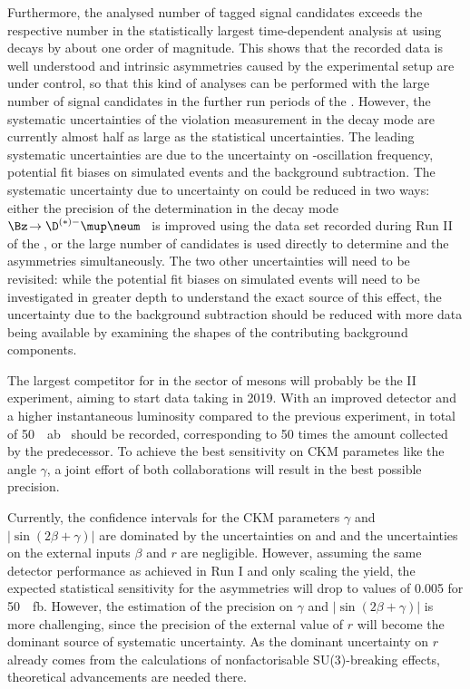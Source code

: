 Furthermore, the analysed number of tagged signal candidates exceeds the respective number in the statistically largest time-dependent \CP analysis at \lhcb using \BdToJPsiKS decays by about one order of magnitude.
This shows that the recorded data is well understood and intrinsic asymmetries caused by \eg the experimental setup are under control, so that this kind of analyses can be performed with the large number of signal candidates in the further run periods of the \lhc.
However, the systematic uncertainties of the \CP violation measurement in the decay mode \mbox{\BdToDpi} are currently almost half as large as the statistical uncertainties.
The leading systematic uncertainties are due to the uncertainty on \Bz-oscillation frequency, potential fit biases on simulated events and the background subtraction.
The systematic uncertainty due to uncertainty on \dm could be reduced in two ways: either the precision of the determination in the decay mode \mbox{$\Bz\!\to\D^{(*)-}\mup\neum$}~\cite{Aaij:2016fdk} is improved using the data set recorded during Run II of the \lhc, or the large number of \BdToDpi candidates is used directly to determine \dm and the \CP asymmetries simultaneously.
The two other uncertainties will need to be revisited: while the potential fit biases on simulated events will need to be investigated in greater depth to understand the exact source of this effect, the uncertainty due to the background subtraction should be reduced with more data being available by examining the shapes of the contributing background components.

The largest competitor for \lhcb in the sector of \B mesons will probably be the \belle II experiment, aiming to start data taking in \num{2019}.
With an improved detector and a higher instantaneous luminosity compared to the previous \belle experiment, in total of \SI{50}{\per\atto\barn}~\cite{Abe:2010gxa} should be recorded, corresponding to \num{50} times the amount collected by the predecessor.
To achieve the best sensitivity on CKM parametes like the angle $\gamma$, a joint effort of both collaborations will result in the best possible precision.

Currently, the confidence intervals for the CKM parameters $\gamma$ and $\left|\sin\!\left(2\beta+\gamma\right)\right|$ are dominated by the uncertainties on \Sf and \Sfbar and the uncertainties on the external inputs $\beta$ and $r$ are negligible.
However, assuming the same detector performance as achieved in Run I and only scaling the \BdToDpi yield, the expected statistical sensitivity for the \CP asymmetries will drop to values of \eg \num{0.005} for \SI{50}{\per\femto\barn}.
However, the estimation of the precision on $\gamma$ and $\left|\sin\!\left(2\beta+\gamma\right)\right|$ is more challenging, since the precision of the external value of $r$ will become the dominant source of systematic uncertainty. As the dominant uncertainty on $r$ already comes from the calculations of nonfactorisable SU(3)-breaking effects, theoretical advancements are needed there.
